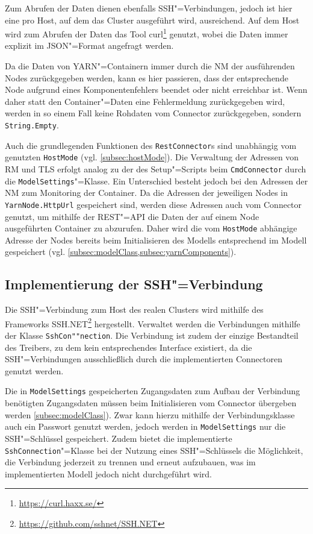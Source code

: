 Zum Abrufen der Daten dienen ebenfalls SSH"=Verbindungen, jedoch ist hier eine pro Host, auf dem das Cluster ausgeführt wird, ausreichend.
Auf dem Host wird zum Abrufen der Daten das Tool curl\footnote{\url{https://curl.haxx.se/}} genutzt, wobei die Daten immer explizit im JSON"=Format angefragt werden.

Da die Daten von YARN"=Containern immer durch die \gls{NM} der ausführenden Nodes zurückgegeben werden, kann es hier passieren, dass der entsprechende Node aufgrund eines Komponentenfehlers beendet oder nicht erreichbar ist.
Wenn daher statt den Container"=Daten eine Fehlermeldung zurückgegeben wird, werden in so einem Fall keine Rohdaten vom Connector zurückgegeben, sondern \texttt{String.Empty}.

Auch die grundlegenden Funktionen des \texttt{RestConnector}s sind unabhängig vom genutzten \texttt{HostMode} (vgl. \cref{subsec:hostMode}).
Die Verwaltung der Adressen von \gls{RM} und \gls{TLS} erfolgt analog zu der des Setup"=Scripts beim \texttt{CmdConnector} durch die \texttt{ModelSettings}"=Klasse.
Ein Unterschied besteht jedoch bei den Adressen der \gls{NM} zum Monitoring der Container.
Da die Adressen der jeweiligen Nodes in \texttt{YarnNode.HttpUrl} gespeichert sind, werden diese Adressen auch vom Connector genutzt, um mithilfe der REST"=API die Daten der auf einem Node ausgeführten Container zu abzurufen.
Daher wird die vom \texttt{HostMode} abhängige Adresse der Nodes bereits beim Initialisieren des Modells entsprechend im Modell gespeichert (vgl. \cref{subsec:modelClass,subsec:yarnComponents}).

\subsection{Implementierung der SSH"=Verbindung}
\label{subsec:sshConnection}

Die SSH"=Verbindung zum Host des realen Clusters wird mithilfe des Frameworks SSH.NET\footnote{\url{https://github.com/sshnet/SSH.NET}} hergestellt.
Verwaltet werden die Verbindungen mithilfe der Klasse \texttt{SshCon""nection}.
Die Verbindung ist zudem der einzige Bestandteil des Treibers, zu dem kein entsprechendes Interface existiert, da die SSH"=Verbindungen ausschließlich durch die implementierten Connectoren genutzt werden.

Die in \texttt{ModelSettings} gespeicherten Zugangsdaten zum Aufbau der Verbindung benötigten Zugangsdaten müssen beim Initialisieren vom Connector übergeben werden \cref{subsec:modelClass}).
Zwar kann hierzu mithilfe der Verbindungsklasse auch ein Passwort genutzt werden, jedoch werden in \texttt{ModelSettings} nur die SSH"=Schlüssel gespeichert.
Zudem bietet die implementierte \texttt{SshConnection}"=Klasse bei der Nutzung eines SSH"=Schlüssels die Möglichkeit, die Verbindung jederzeit zu trennen und erneut aufzubauen, was im implementierten Modell jedoch nicht durchgeführt wird.

